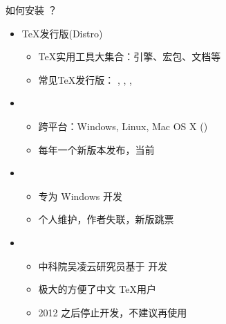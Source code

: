 \begin{frame}{如何安装 ？}
  \begin{itemize}
    \item \TeX{}发行版(Distro)
      \begin{itemize}
        \item \TeX{}实用工具大集合：引擎、宏包、文档等
        \item 常见\TeX{}发行版：
          \alert{\TL}, \CTeX, \MiKTeX, \MacTeX
      \end{itemize}
    \item \TL
      \begin{itemize}
        \item 跨平台：Windows, Linux, Mac OS X (\MacTeX)
        \item 每年一个新版本发布，当前 
      \end{itemize}
    \item \MiKTeX
      \begin{itemize}
        \item 专为 Windows 开发
        \item 个人维护，作者失联，新版跳票
      \end{itemize}
    \item \CTeX
      \begin{itemize}
        \item 中科院吴凌云研究员基于 \MiKTeX 开发
        \item 极大的方便了中文 \TeX 用户
        \item 2012 之后停止开发，不建议再使用
      \end{itemize}
  \end{itemize}
\end{frame}

